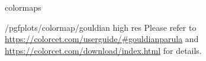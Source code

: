 \begin{pgfplotslibrary}{colormaps}
\begin{stylekey}{/pgfplots/colormap/gouldian high res}
    Please refer to \url{https://colorcet.com/userguide/#gouldianparula} and
    \url{https://colorcet.com/download/index.html} for details.
\begin{codeexample}
\pgfplotsset{
    colormap name=gouldian,
}
\end{codeexample}

\begin{codeexample}
\pgfplotsset{
    colormap/gouldian high res,
}
\end{codeexample}
\end{stylekey}

\end{pgfplotslibrary}
\endgroup
